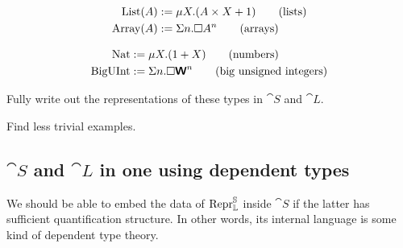 \begin{align}
  \mathrm{List}(A)  & := \mu X . (A \times X + 1) \tag{lists} \\
  \mathrm{Array}(A) & := \Sigma n . \square A ^n \tag{arrays}
\end{align}

\begin{align}
  \mathrm{Nat}     & := \mu X . (1 + X) \tag{numbers}                              \\
  \mathrm{BigUInt} & := \Sigma n . \square \textsf{\textbf{W}} ^n \tag{big unsigned integers}
\end{align}

Fully write out the representations of these types in $\cat S$ and $\cat L$.

Find less trivial examples.

\subsection{$\cat S$ and $\cat L$ in one using dependent types}

We should be able to embed the data of $\mathrm{Repr} ^{\mathbb S} _{\mathbb L}$ inside $\cat
  S$ if the latter has sufficient quantification structure. In other words, its
internal language is some kind of dependent type theory.
